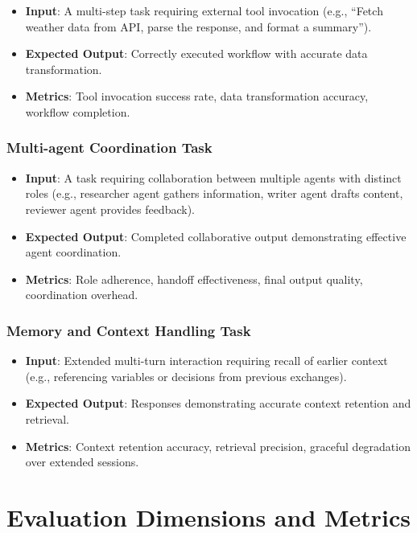 \documentclass[]
{UCD_CS_FYP_Report}
\begin{document}
\begin{itemize}
  \item \textbf{Input}: A multi-step task requiring external tool invocation (e.g., ``Fetch weather data from API, parse the response, and format a summary'').
  \item \textbf{Expected Output}: Correctly executed workflow with accurate data transformation.
  \item \textbf{Metrics}: Tool invocation success rate, data transformation accuracy, workflow completion.
\end{itemize}

\subsubsection{Multi-agent Coordination Task}

\begin{itemize}
  \item \textbf{Input}: A task requiring collaboration between multiple agents with distinct roles (e.g., researcher agent gathers information, writer agent drafts content, reviewer agent provides feedback).
  \item \textbf{Expected Output}: Completed collaborative output demonstrating effective agent coordination.
  \item \textbf{Metrics}: Role adherence, handoff effectiveness, final output quality, coordination overhead.
\end{itemize}

\subsubsection{Memory and Context Handling Task}

\begin{itemize}
  \item \textbf{Input}: Extended multi-turn interaction requiring recall of earlier context (e.g., referencing variables or decisions from previous exchanges).
  \item \textbf{Expected Output}: Responses demonstrating accurate context retention and retrieval.
  \item \textbf{Metrics}: Context retention accuracy, retrieval precision, graceful degradation over extended sessions.
\end{itemize}

\section{Evaluation Dimensions and Metrics}
\end{document}
